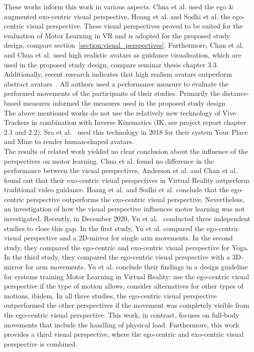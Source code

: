 These works inform this work in various aspects. Chua et al. used the ego \& augmented exo-centric visual perspective, Hoang et al. and Sodhi et al. the ego-centric visual perspective. These visual perspectives proved to be suited for the evaluation of Motor Learning in VR and is adopted for the proposed study design, compare section~\ref{section:visual_perspectives}. Furthermore, Chan et al. and Chua et al. used high realistic avatars as guidance visualisation, which are used in the proposed study design, compare seminar thesis chapter 3.3. Additionally, recent research indicates that high realism avatars outperform abstract avatars~\cite{max,perspectivematters}. All authors used a performance measure to evaluate the performed movements of the participants of their studies. Primarily the distance-based measures informed the measures used in the proposed study design\\%
The above mentioned works do not use the relatively new technology of Vive Trackers in combination with Inverse Kinematics (IK, see project report chapter 2.1 and 2.2). Sra et al.~\cite{samesetup} used this technology in 2018 for their system Your Place and Mine to render human-shaped avatars.\\
The results of related work yielded no clear conclusion about the influence of the perspectives on motor learning. Chua et al. found no difference in the performance between the visual perspectives, Anderson et al. and Chan et al. found out that their exo-centric visual perspectives in Virtual Reality outperform traditional video guidance. Hoang et al. and Sodhi et al. conclude that the ego-centric perspective outperforms the exo-centric visual perspective. Nevertheless, an investigation of how the visual perspective influences motor learning was not investigated. Recently, in December 2020, Yu et al.~\cite{perspectivematters} conducted three independent studies to close this gap. In the first study, Yu et al. compared the ego-centric visual perspective and a 2D-mirror for single arm movements. In the second study, they compared the ego-centric and exo-centric visual perspective for Yoga. In the third study, they compared the ego-centric visual perspective with a 3D-mirror for arm movements. Yu et al. conclude their findings in a design guideline for systems training Motor Learning in Virtual Reality: use the ego-centric visual perspective if the type of motion allows, consider alternatives for other types of motions, ibidem. In all three studies, the ego-centric visual perspective outperformed the other perspectives if the movement was completely visible from the ego-centric visual perspective. This work, in contrast, focuses on full-body movements that include the handling of physical load. Furthermore, this work provides a third visual perspective, where the ego-centric and exo-centric visual perspective is combined.




